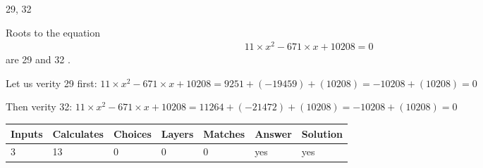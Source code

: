 \documentclass[12pt]{article}
\begin{document}
 

29,  %
32
 
 
 
\noindent{}
 
 

 
 
 
\noindent{}
 
 

Roots to the equation
\begin{eqnarray*}
11 \times x^2  %
-671
                 \times x    %
+  %
10208 =0
\end{eqnarray*}
are  %
29 and  %
32 .
 
Let us verity  %
29 first:
$  %
11 \times x^2  %
-671
                 \times x    %
+  %
10208
  = %
9251+( %
-19459)+( %
10208)
  = %
-10208+( %
10208)
  = %
0
$
 
Then verity  %
32:
$  %
11 \times x^2  %
-671
                 \times x    %
+  %
10208
  = %
11264+( %
-21472)+( %
10208)
  = %
-10208+( %
10208)
  = %
0
$
 
 
 
\noindent{}
 
 

 
\vspace{0.3in}
   
   
   
   
\noindent\begin{tabular}{|l|l|l|l|l|l|l|}
 \hline
Inputs & Calculates & Choices & Layers & Matches & Answer & Solution \\ \hline
           3  & 
          13  & 
           0
  & 
           0  & 
           0  & 
  yes & 
  yes 
  \\ \hline
 \end{tabular}
   
   
   
   
\noindent{}
   
   
  
\end{document}
